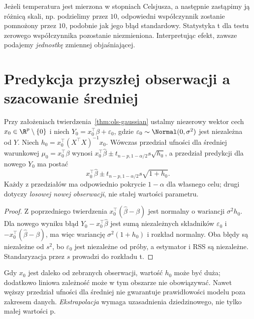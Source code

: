 \begin{przyklad}
Jeżeli temperatura jest mierzona w stopniach Celsjusza,
a następnie zastąpimy ją różnicą skali, np. podzielimy
przez $10$, odpowiedni współczynnik zostanie pomnożony
przez $10$, podobnie jak jego błąd standardowy.
Statystyka t dla testu zerowego współczynnika pozostanie
niezmieniona. Interpretując efekt, zawsze podajemy
\emph{jednostkę} zmiennej objaśniającej.
\end{przyklad}

\section{Predykcja przyszłej obserwacji a szacowanie średniej}
\begin{twierdzenie}
\label{thm:prediction-vs-mean}
Przy założeniach twierdzenia~\ref{thm:ols-gaussian}
ustalmy niezerowy wektor cech $x_0\in\R^p\setminus\{0\}$ i niech
$Y_0=x_0^\top\beta+\varepsilon_0$, gdzie
$\varepsilon_0\sim\Normal(0,\sigma^2)$ jest niezależna
od $Y$. Niech $h_0=x_0^\top(X^\top X)^{-1}x_0$.
Wówczas przedział ufności dla średniej warunkowej
$\mu_0=x_0^\top\beta$ wynosi
$x_0^\top\widehat\beta\pm t_{n-p,1-\alpha/2}s\sqrt{h_0}$,
a przedział predykcji dla nowego $Y_0$ ma postać
\[
 x_0^\top\widehat\beta\pm
 t_{n-p,1-\alpha/2}s\sqrt{1+h_0}.
\]
Każdy z przedziałów ma odpowiednio pokrycie
$1-\alpha$ dla własnego celu; drugi dotyczy \emph{losowej
nowej obserwacji}, nie stałej wartości parametru.
\end{twierdzenie}
\begin{proof}
Z poprzedniego twierdzenia
$x_0^\top(\widehat\beta-\beta)$ jest normalny o
wariancji $\sigma^2h_0$. Dla nowego wyniku błąd
$Y_0-x_0^\top\widehat\beta$ jest sumą niezależnych
składników $\varepsilon_0$ i
$-x_0^\top(\widehat\beta-\beta)$, ma więc wariancję
$\sigma^2(1+h_0)$ i rozkład normalny.
Oba błędy są niezależne od $s^2$, bo $\varepsilon_0$
jest niezależne od próby, a estymator i RSS są niezależne.
Standaryzacja przez $s$ prowadzi do rozkładu t.
\end{proof}

\begin{uwaga}[Ekstrapolacja]
Gdy $x_0$ jest daleko od zebranych obserwacji, wartość
$h_0$ może być duża; dodatkowo liniowa zależność może
w tym obszarze nie obowiązywać. Nawet węższy przedział
ufności dla średniej nie gwarantuje prawidłowości modelu
poza zakresem danych. \emph{Ekstrapolacja} wymaga
uzasadnienia dziedzinowego, nie tylko małej wartości p.
\end{uwaga}

